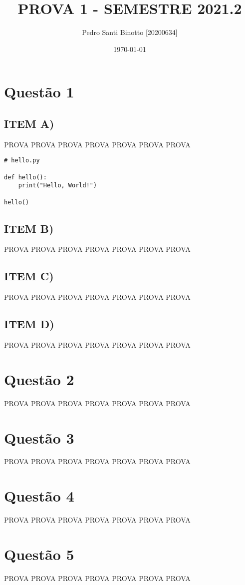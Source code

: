 \documentclass[12pt, letterpaper]{article}
\title{PROVA 1 - SEMESTRE 2021.2}
\author{Pedro Santi Binotto [20200634]}
\date{\today}
\begin{document}
\maketitle

\newpage
\section{Questão 1}
\subsection{ITEM A)}
PROVA PROVA PROVA PROVA PROVA PROVA PROVA

\begin{lstlisting}
# hello.py

def hello():
    print("Hello, World!")

hello()
\end{lstlisting}

\subsection{ITEM B)}
PROVA PROVA PROVA PROVA PROVA PROVA PROVA

\subsection{ITEM C)}
PROVA PROVA PROVA PROVA PROVA PROVA PROVA

\subsection{ITEM D)}
PROVA PROVA PROVA PROVA PROVA PROVA PROVA

\newpage
\section{Questão 2}
PROVA PROVA PROVA PROVA PROVA PROVA PROVA

\newpage
\section{Questão 3}
PROVA PROVA PROVA PROVA PROVA PROVA PROVA

\newpage
\section{Questão 4}
PROVA PROVA PROVA PROVA PROVA PROVA PROVA

\newpage
\section{Questão 5}
PROVA PROVA PROVA PROVA PROVA PROVA PROVA
\end{document}
